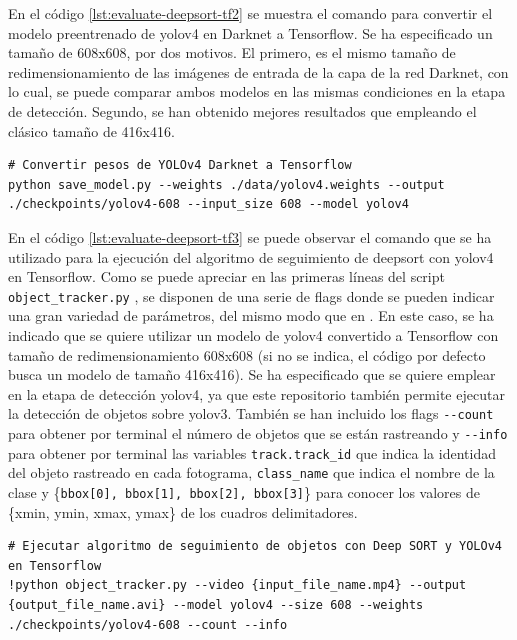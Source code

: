 En el código \ref{lst:evaluate-deepsort-tf2} se muestra el comando para convertir el modelo preentrenado de \gls{yolov4} en Darknet a Tensorflow. Se ha especificado un tamaño de 608x608, por dos motivos. El primero, es el mismo tamaño de redimensionamiento de las imágenes de entrada de la capa de la red Darknet, con lo cual, se puede comparar ambos modelos en las mismas condiciones en la etapa de detección. Segundo, se han obtenido mejores resultados que empleando el clásico tamaño de 416x416.

\vspace{0.5cm}
\begin{lstlisting}[language=iPython,caption=Evaluación del seguimiento de objetos Deep SORT y YOLOv4 en Tensorflow (2),captionpos=b,label={lst:evaluate-deepsort-tf2}]
# Convertir pesos de YOLOv4 Darknet a Tensorflow
python save_model.py --weights ./data/yolov4.weights --output ./checkpoints/yolov4-608 --input_size 608 --model yolov4
\end{lstlisting}

En el código \ref{lst:evaluate-deepsort-tf3} se puede observar el comando que se ha utilizado para la ejecución del algoritmo de seguimiento de \gls{deepsort} con \gls{yolov4} en Tensorflow. Como se puede apreciar en las primeras líneas del script \texttt{object\_tracker.py} \cite{yolov4-deepsort}, se disponen de una serie de flags donde se pueden indicar una gran variedad de parámetros, del mismo modo que en \cite{yolov4-tf-github-original}. En este caso, se ha indicado que se quiere utilizar un modelo de \gls{yolov4} convertido a Tensorflow con tamaño de redimensionamiento 608x608 (si no se indica, el código por defecto busca un modelo de tamaño 416x416). Se ha especificado que se quiere emplear en la etapa de detección \gls{yolov4}, ya que este repositorio también permite ejecutar la detección de objetos sobre \gls{yolo}v3. También se han incluido los flags \texttt{-{}-count} para obtener por terminal el número de objetos que se están rastreando y \texttt{-{}-info} para obtener por terminal las variables \texttt{track.track\_id} que indica la identidad del objeto rastreado en cada fotograma, \texttt{class\_name} que indica el nombre de la clase y \{\texttt{bbox[0], bbox[1], bbox[2], bbox[3]}\} para conocer los valores de \{xmin, ymin, xmax, ymax\} de los cuadros delimitadores.

\vspace{0.5cm}
\begin{lstlisting}[language=iPython,caption=Evaluación del seguimiento de objetos Deep SORT y YOLOv4 en Tensorflow (3),captionpos=b,label={lst:evaluate-deepsort-tf3}]
# Ejecutar algoritmo de seguimiento de objetos con Deep SORT y YOLOv4 en Tensorflow
!python object_tracker.py --video {input_file_name.mp4} --output {output_file_name.avi} --model yolov4 --size 608 --weights ./checkpoints/yolov4-608 --count --info
\end{lstlisting}


